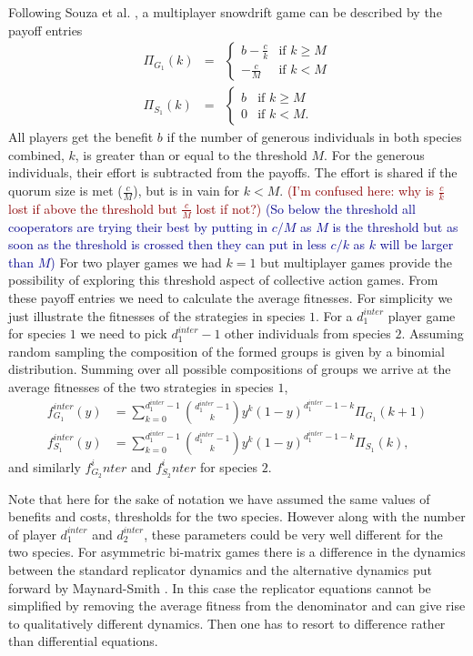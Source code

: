 \documentclass[12pt]{article}
\newcommand{\cha}[1]{\textcolor{darkblue}{(#1)}}
\newcommand{\marcus}[1]{\textcolor{darkred}{(#1)}}
\begin{document}
\begin{appendices}
Following Souza et al. \citep{souza:JTB:2009},  
a multiplayer snowdrift game can be described by the payoff entries
\begin{eqnarray}
\Pi_{G_1} (k)  &=& \begin{cases} b-\frac{c}{k} & \textrm{if } k \geq M \\  -\frac{c}{M} & \textrm{if } k < M \end{cases} \nonumber
\\
\Pi_{S_1} (k)  &=& \begin{cases} b & \textrm{if } k \geq M \\ 0 & \textrm{if } k < M. \end{cases}
\label{eqintergamepayoffs}
\end{eqnarray}
%
All players get the benefit $b$ if the number of generous individuals in both species combined, $k$, is greater than or equal to the threshold $M$.
For the generous individuals, their effort is subtracted from the payoffs.
The effort is shared if the quorum size is met ($\frac{c}{M}$), but is in vain for $k<M$. \marcus{I'm confused here: why is $\frac{c}{k}$ lost if above the threshold but  $\frac{c}{M}$ lost if not?}
\cha{So below the threshold all cooperators are trying their best by putting in $c/M$ as $M$ is the threshold but as soon as the threshold is crossed then they can put in less $c/k$ as $k$ will be larger than $M$}
For two player games we had $k=1$ but multiplayer games provide the possibility of exploring this threshold aspect of collective action games.
From these payoff entries we need to calculate the average fitnesses.
For simplicity we just illustrate the fitnesses of the strategies in species $1$.
For a $d_1^{inter}$ player game for species $1$ we need to pick $d_1^{inter}-1$ other individuals from species $2$.
Assuming random sampling the composition of the formed groups is given by a binomial distribution.
Summing over all possible compositions of groups we arrive at  the average fitnesses of the two strategies in species $1$,
%
\begin{align}
f^{inter}_{G_1} (y) &= \sum_{k=0}^{d_1^{inter} -1} \binom{d_1^{inter} -1}{k}y^k (1-y)^{d_1^{inter} -1-k} \Pi_{G_1}(k+1) \nonumber \\
f^{inter}_{S_1} (y) &= \sum_{k=0}^{d_1^{inter} -1} \binom{d_1^{inter} -1}{k}y^k (1-y)^{d_1^{inter} -1-k} \Pi_{S_1}(k),
\label{interfiteqs}
\end{align}
%
and similarly $f_{G_2}^inter$ and $f_{S_2}^inter$ for species $2$.

Note that here for the sake of notation we have assumed the same values of benefits and costs, thresholds for the two species. However along with the number of player $d_1^{inter}$ and $d_2^{inter}$, these parameters could be very well different for the two species.
For asymmetric bi-matrix games there is a difference in the dynamics between the standard replicator dynamics and the alternative dynamics put forward by Maynard-Smith \citep{maynard-smith:book:1982}.
In this case the replicator equations cannot be simplified by removing the average fitness from the denominator and can give rise to qualitatively different dynamics. 
Then one has to resort to difference rather than differential equations.


\end{appendices}
\end{document}
